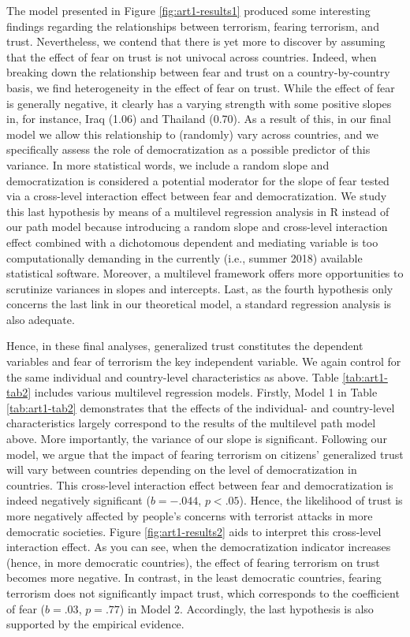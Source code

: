The model presented in Figure \ref{fig:art1-results1} produced some interesting findings regarding the relationships between terrorism, fearing terrorism, and trust. Nevertheless, we contend that there is yet more to discover by assuming that the effect of fear on trust is not univocal across countries. Indeed, when breaking down the relationship between fear and trust on a country-by-country basis, we find heterogeneity in the effect of fear on trust. While the effect of fear is generally negative, it clearly has a varying strength with some positive slopes in, for instance, Iraq (1.06) and Thailand (0.70). As a result of this, in our final model we allow this relationship to (randomly) vary across countries, and we specifically assess the role of democratization as a possible predictor of this variance. In more statistical words, we include a random slope and democratization is considered a potential moderator for the slope of fear tested via a cross-level interaction effect between fear and democratization. We study this last hypothesis by means of a multilevel regression analysis in R instead of our path model because introducing a random slope and cross-level interaction effect combined with a dichotomous dependent and mediating variable is too computationally demanding in the currently (i.e., summer 2018) available statistical software. Moreover, a multilevel framework offers more opportunities to scrutinize variances in slopes and intercepts. Last, as the fourth hypothesis only concerns the last link in our theoretical model, a standard regression analysis is also adequate.


Hence, in these final analyses, generalized trust constitutes the dependent variables and fear of terrorism the key independent variable. We again control for the same individual and country-level characteristics as above. Table \ref{tab:art1-tab2} includes various multilevel regression models. Firstly, Model 1 in Table \ref{tab:art1-tab2} demonstrates that the effects of the individual- and country-level characteristics largely correspond to the results of the multilevel path model above. More importantly, the variance of our slope is significant. Following our model, we argue that the impact of fearing terrorism on citizens’ generalized trust will vary between countries depending on the level of democratization in countries. This cross-level interaction effect between fear and democratization is indeed negatively significant ($b = -.044$, $p < .05$). Hence, the likelihood of trust is more negatively affected by people’s concerns with terrorist attacks in more democratic societies. Figure \ref{fig:art1-results2} aids to interpret this cross-level interaction effect. As you can see, when the democratization indicator increases (hence, in more democratic countries), the effect of fearing terrorism on trust becomes more negative. In contrast, in the least democratic countries, fearing terrorism does not significantly impact trust, which corresponds to the coefficient of fear ($b = .03$, $p = .77$) in Model 2. Accordingly, the last hypothesis is also supported by the empirical evidence. 


